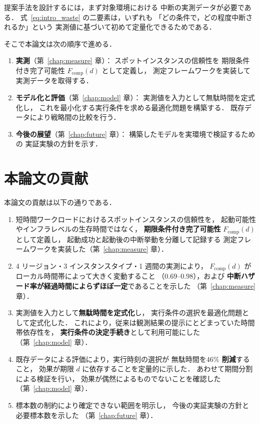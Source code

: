 \documentclass[11pt,a4paper]{ltjsreport}
\newcommand{\Fcomp}{F_{\mathrm{comp}}}
\begin{document}
提案手法を設計するには，まず対象環境における
中断の実測データが必要である．
式~\eqref{eq:intro_waste} の二要素は，いずれも
「どの条件で，どの程度中断されるか」という
実測値に基づいて初めて定量化できるためである．

そこで本論文は次の順序で進める．

\begin{enumerate}
  \item \textbf{実測}（第~\ref{chap:measure} 章）：
        スポットインスタンスの信頼性を
        期限条件付き完了可能性 $\Fcomp(d)$ として定義し，
        測定フレームワークを実装して実測データを取得する．
  \item \textbf{モデル化と評価}（第~\ref{chap:model} 章）：
        実測値を入力として無駄時間を定式化し，
        これを最小化する実行条件を求める最適化問題を構築する．
        既存データにより戦略間の比較を行う．
  \item \textbf{今後の展望}（第~\ref{chap:future} 章）：
        構築したモデルを実環境で検証するための
        実証実験の方針を示す．
\end{enumerate}

\section{本論文の貢献}

本論文の貢献は以下の通りである．

\begin{enumerate}
  \item 短時間ワークロードにおけるスポットインスタンスの信頼性を，
        起動可能性やインフラレベルの生存時間ではなく，
        \textbf{期限条件付き完了可能性} $\Fcomp(d)$ として定義し，
        起動成功と起動後の中断挙動を分離して記録する
        測定フレームワークを実装した（第~\ref{chap:measure} 章）．
  \item 4 リージョン・3 インスタンスタイプ・1 週間の実測により，
        $\Fcomp(d)$ がローカル時間帯によって大きく変動すること
        （$0.69$--$0.98$），および
        \textbf{中断ハザード率が経過時間によらずほぼ一定}であることを示した
        （第~\ref{chap:measure} 章）．
  \item 実測値を入力として\textbf{無駄時間を定式化}し，
        実行条件の選択を最適化問題として定式化した．
        これにより，従来は観測結果の提示にとどまっていた時間帯依存性を，
        \textbf{実行条件の決定手続き}として利用可能にした
        （第~\ref{chap:model} 章）．
  \item 既存データによる評価により，実行時刻の選択が
        無駄時間を\textbf{$46\%$ 削減}すること，
        効果が期限 $d$ に依存することを定量的に示した．
        あわせて期間分割による検証を行い，
        効果が偶然によるものでないことを確認した
        （第~\ref{chap:model} 章）．
  \item 標本数の制約により確定できない範囲を明示し，
        今後の実証実験の方針と必要標本数を示した
        （第~\ref{chap:future} 章）．
\end{enumerate}
\end{document}
